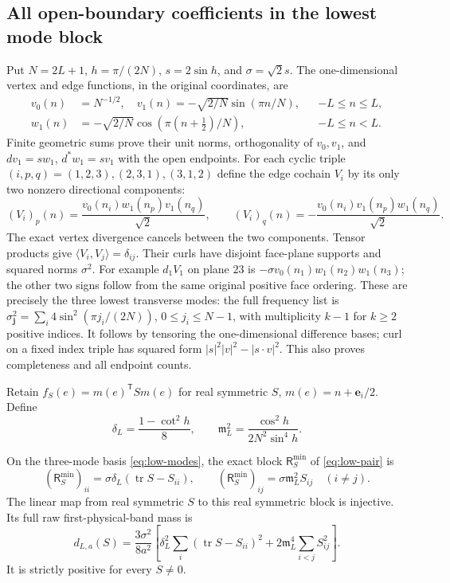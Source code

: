 \subsection{All open-boundary coefficients in the lowest mode block}

Put $N=2L+1$, $h=\pi/(2N)$, $s=2\sin h$, and $\sigma=\sqrt2s$.
The one-dimensional vertex and edge functions, in the original
coordinates, are
\begin{align*}
 v_0(n)&=N^{-1/2},\quad
 v_1(n)=-\sqrt{2/N}\sin(\pi n/N), &&-L\le n\le L,\\
 w_1(n)&=-\sqrt{2/N}\cos(\pi(n+\tfrac12)/N), &&-L\le n<L.
\end{align*}
Finite geometric sums prove their unit norms, orthogonality of
$v_0,v_1$, and $dv_1=sw_1$, $d^*w_1=sv_1$ with the open endpoints.
For each cyclic triple $(i,p,q)=(1,2,3),(2,3,1),(3,1,2)$ define the
edge cochain $V_i$ by its only two nonzero directional components:
\begin{equation}\label{eq:low-modes}
 (V_i)_p(n)=\frac{v_0(n_i)w_1(n_p)v_1(n_q)}{\sqrt2},\qquad
 (V_i)_q(n)=-\frac{v_0(n_i)v_1(n_p)w_1(n_q)}{\sqrt2}.
\end{equation}
The exact vertex divergence cancels between the two components.
Tensor products give $\langle V_i,V_j\rangle=\delta_{ij}$.
Their curls have disjoint face-plane supports and squared norms $\sigma^2$.
For example $d_1V_1$ on plane $23$ is
$-\sigma v_0(n_1)w_1(n_2)w_1(n_3)$; the other two signs follow from
the same original positive face ordering. These are precisely the three
lowest transverse modes: the full frequency list is
$\sigma_{\mathbf j}^2=\sum_i4\sin^2(\pi j_i/(2N))$,
$0\le j_i\le N-1$, with multiplicity $k-1$ for $k\ge2$ positive indices.
It follows by tensoring the one-dimensional difference bases; curl on a
fixed index triple has squared form $|s|^2|v|^2-|s\cdot v|^2$.
This also proves completeness and all endpoint counts.

Retain $f_S(e)=m(e)^{\mathsf T}S m(e)$ for real symmetric $S$,
$m(e)=n+\mathbf e_i/2$. Define
\begin{equation}\label{eq:low-delta}
 \delta_L=\frac{1-\cot^2h}{8},\qquad
 \mathfrak m_L^2=\frac{\cos^2h}{2N^2\sin^4h}.
\end{equation}

\begin{theorem}\label{thm:low-block}
On the three-mode basis \eqref{eq:low-modes}, the exact block
$\mathsf R_S^{\min}$ of \eqref{eq:low-pair} is
\begin{equation}\label{eq:low-block}
 (\mathsf R_S^{\min})_{ii}=\sigma\delta_L(\operatorname{tr}S-S_{ii}),
 \qquad
 (\mathsf R_S^{\min})_{ij}=\sigma\mathfrak m_L^2S_{ij}\quad(i\ne j).
\end{equation}
The linear map from real symmetric $S$ to this real symmetric block is
injective. Its full raw first-physical-band mass is
\begin{equation}\label{eq:low-d}
 d_{L,a}(S)=\frac{3\sigma^2}{8a^2}
 \left[
 \delta_L^2\sum_i(\operatorname{tr}S-S_{ii})^2+
 2\mathfrak m_L^4\sum_{i<j}S_{ij}^2
 \right].
\end{equation}
It is strictly positive for every $S\ne0$.
\end{theorem}


